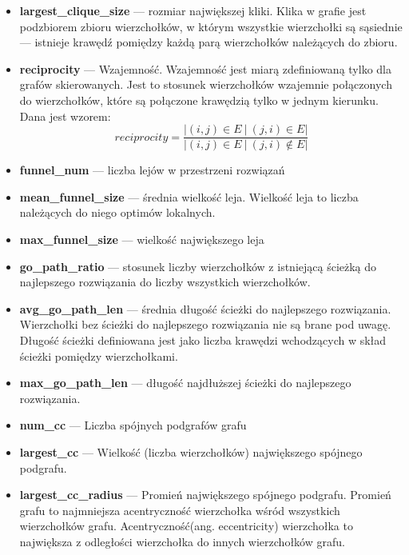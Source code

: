 \begin{itemize}
      \item \textbf{largest\_clique\_size} --- rozmiar największej kliki. Klika w grafie jest podzbiorem zbioru wierzchołków, w którym wszystkie wierzchołki są sąsiednie --- istnieje krawędź pomiędzy każdą parą wierzchołków należących do zbioru.
      \item \textbf{reciprocity} --- Wzajemność. Wzajemność jest miarą zdefiniowaną tylko dla grafów skierowanych. Jest to stosunek wierzchołków wzajemnie połączonych do wierzchołków, które są połączone krawędzią tylko w jednym kierunku.
            Dana jest wzorem:
            \begin{equation}
                  \label{eq:reciprocity}
                  reciprocity = \frac{ |(i, j) \in E  \: | \: (j, i) \in E| }{|(i, j) \in E  \: | \: (j, i) \notin E| }
            \end{equation}
      \item \textbf{funnel\_num} --- liczba lejów w przestrzeni rozwiązań
      \item \textbf{mean\_funnel\_size} --- średnia wielkość leja. Wielkość leja to liczba należących do niego optimów lokalnych.
      \item \textbf{max\_funnel\_size} --- wielkość największego leja
      \item \textbf{go\_path\_ratio} --- stosunek liczby wierzchołków z istniejącą ścieżką do najlepszego rozwiązania do liczby wszystkich wierzchołków.
      \item \textbf{avg\_go\_path\_len} --- średnia długość ścieżki do najlepszego rozwiązania. Wierzchołki bez ścieżki do najlepszego rozwiązania nie są brane pod uwagę.
            Długość ścieżki definiowana jest jako liczba krawędzi wchodzących w skład ścieżki pomiędzy wierzchołkami.
      \item \textbf{max\_go\_path\_len} --- długość najdłuższej ścieżki do najlepszego rozwiązania.
      \item \textbf{num\_cc} --- Liczba spójnych podgrafów grafu
      \item \textbf{largest\_cc} --- Wielkość (liczba wierzchołków) największego spójnego podgrafu.
      \item \textbf{largest\_cc\_radius} --- Promień największego spójnego podgrafu. Promień grafu to najmniejsza acentryczność wierzchołka wśród wszystkich wierzchołków grafu.
            Acentryczność(ang. eccentricity) wierzchołka to największa z odległości wierzchołka do innych wierzchołków grafu.
\end{itemize}


